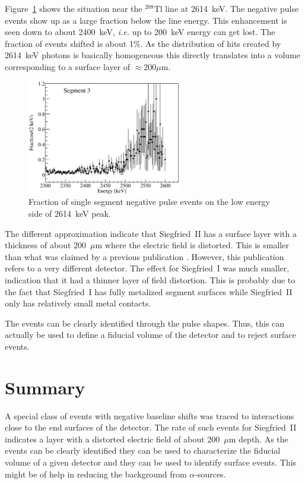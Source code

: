 Figure~\ref{fig:np:frac2614} shows the situation near the $^{208}$Tl
line at 2614~keV. The negative pulse events show up as a large fraction
below the line energy. This enhancement is seen down to about 2400~keV,
\textit{i.e.} up to 200~keV energy can get lost. The fraction of
events shifted is about 1\%. As the distribution of hits created by
2614~keV photons is basically homogeneous this directly translates into
a volume corresponding to a surface layer of $\approx 200 \mu$m.

\begin{figure}[tphb]
\centering
\includegraphics[width=0.6\textwidth]{NegFraction2614}
\caption{Fraction of single segment negative pulse events on the low
energy side of 2614~keV peak.}
\label{fig:np:frac2614}
\end{figure}

The different approximation indicate that Siegfried~II has a surface
layer with a thickness of about 200~$\mu$m where the electric field is
distorted. This is smaller than what was claimed by a previous
publication \cite{Ebe08}. However, this publication refers to a very
different detector. The effect for Siegfried~I was much smaller,
indication that it had a thinner layer of field distortion. This is
probably due to the fact that Siegfried~I has fully metalized segment
surfaces while Siegfried~II only has relatively small metal contacts.

The events can be clearly identified through the pulse shapes. Thus,
this can actually be used to define a fiducial volume of the detector
and to reject surface events.

\section{Summary}
\label{sec:np:sum}
A special class of events with negative baseline shifts was traced to
interactions close to the end surfaces of the detector. The rate of
such events for Siegfried~II indicates a layer with a distorted
electric field of about 200~$\mu$m depth. As the events can be clearly
identified they can be used to characterize the fiducial volume of a
given detector and they can be used to identify surface events. This
might be of help in reducing the background from $\alpha$-sources.

